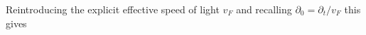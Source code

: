 Reintroducing the explicit effective speed of light \( v_F \) and recalling \( \partial_0 = \partial_t / v_F \) this gives
\begin{comment}
The untilted Weyl Hamiltonian
\[
H_s = s \sigma^i k_i
\]
may of course be considered a Weyl decomposition of a full massless Dirac equation.

\todo{Why do we have to consider 4x4? Is the definitions not also valid for 2x2?}
\todo{Regarding the non-symmetry of the stress tensor, see keichelriess eq 5.16 with discussion}

The untilted Weyl Hamiltonian
\[
H_s = s \sigma^i k_i
\]
can be considered the Hamiltonian of one part of a Weyl decomposition of a Dirac system.
The Weyl field has the Lagrangian density \cite{kachelriessQuantumFieldsHubble2018}
\begin{equation}
  \label{eq:58}
  \mathcal{L} = i \phi^{\dagger} \sigma^{\mu} \partial_{\mu} \phi,
\end{equation}
which may be seen directly from the Dirac Lagrangian \( i \bar{\psi} \slashed{\partial } \psi  \) by taking \( \psi = (\phi_L, \phi_R)^T \) and set, for example, \( \phi _R = 0 \).
Symmetrizing in daggered and undaggered fields
\footnote{The Lagrangian itself is unphysical, and we may transform it in any way that leaves the action \( \int \mathcal{L} \) invariant.}
\todo{Alternatively argue by directly showning that this does not affect the action by doing an integration by parts}
\[
  \mathcal{L} = \frac{i}{2} \left(\phi^{\dagger} \sigma^{\mu} \partial_{\mu} \phi - \partial_{\mu} \phi^{\dagger} \sigma^{\mu} \phi \right),
\]
which will prove to be more convenient to work with.
Adapting the definition Eq.~\eqref{eq:57} the energy-momentum tensor for the untilted Dirac cone is thus
\begin{equation}
  \label{eq:59}
  T^{\mu \nu} =
  \frac{i}{2} (
  \phi^{\dagger} \sigma^{\mu} \partial_{\nu} \phi
  - \sigma^{\mu} \phi \partial_{\nu} \phi^{\dagger}
  - \eta^{\mu \nu} \mathcal{L}
  ).
\end{equation}


\end{comment}
